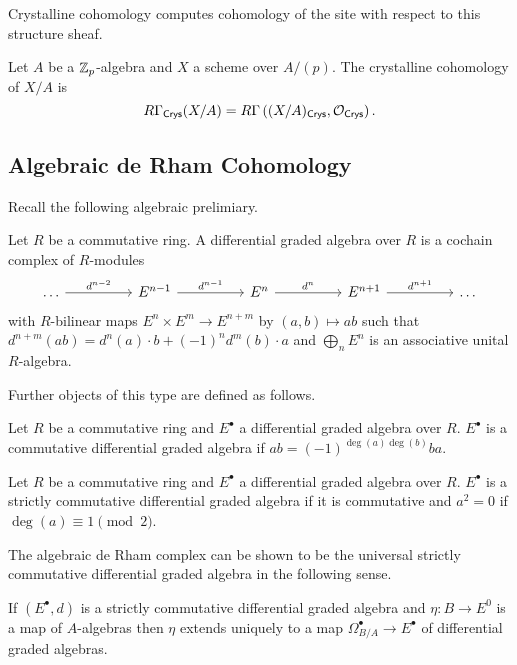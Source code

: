 Crystalline cohomology computes cohomology of the site with respect to this structure sheaf. 
\begin{definition}\label{def: crystalline cohomology}
    Let $A$ be a $\mathbb{Z}_{p}$-algebra and $X$ a scheme over $A/(p)$. The crystalline cohomology of $X/A$ is 
    $$R\Gamma_{\mathsf{Crys}}(X/A)=R\Gamma\left((X/A)_{\mathsf{Crys}},\mathcal{O}_{\mathsf{Crys}}\right).$$
\end{definition}
\subsection{Algebraic de Rham Cohomology}\label{app subsec: algebraic de Rham cohomology}
Recall the following algebraic prelimiary. 
\begin{definition}\label{def: DGA}
    Let $R$ be a commutative ring. A differential graded algebra over $R$ is a cochain complex of $R$-modules 
    $$%
    \begin{tikzcd}
        \dots && {E^{n-1}} && {E^{n}} && {E^{n+1}} && \dots
        \arrow["{d^{n-2}}", from=1-1, to=1-3]
        \arrow["{d^{n-1}}", from=1-3, to=1-5]
        \arrow["{d^{n}}", from=1-5, to=1-7]
        \arrow["{d^{n+1}}", from=1-7, to=1-9]
    \end{tikzcd}$$
    with $R$-bilinear maps $E^{n}\times E^{m}\to E^{n+m}$ by $(a,b)\mapsto ab$ such that $d^{n+m}(ab)=d^{n}(a)\cdot b+(-1)^{n}d^{m}(b)\cdot a$ and $\bigoplus_{n}E^{n}$ is an associative unital $R$-algebra. 
\end{definition}
Further objects of this type are defined as follows. 
\begin{definition}\label{def: commutative DGA}
    Let $R$ be a commutative ring and $E^{\bullet}$ a differential graded algebra over $R$. $E^{\bullet}$ is a commutative differential graded algebra if $ab=(-1)^{\deg(a)\deg(b)}ba$. 
\end{definition}
\begin{definition}\label{def: strictly commutative DGA}
    Let $R$ be a commutative ring and $E^{\bullet}$ a differential graded algebra over $R$. $E^{\bullet}$ is a strictly commutative differential graded algebra if it is commutative and $a^{2}=0$ if $\deg(a)\equiv1\pmod{2}$.
\end{definition}
The algebraic de Rham complex can be shown to be the universal strictly commutative differential graded algebra in the following sense. 
\begin{proposition}\label{prop: universal property of de Rham complex}
    If $(E^{\bullet}, d)$ is a strictly commutative differential graded algebra and $\eta:B\to E^{0}$ is a map of $A$-algebras then $\eta$ extends uniquely to a map $\Omega^{\bullet}_{B/A}\to E^{\bullet}$ of differential graded algebras. 
\end{proposition}